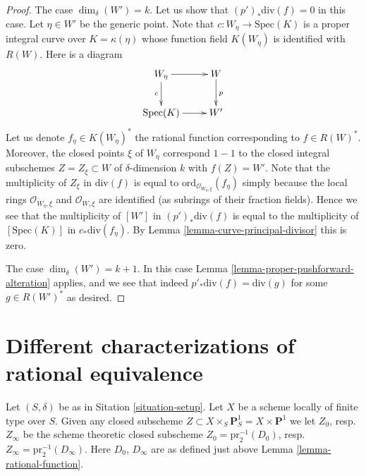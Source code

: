 \begin{proof}
\medskip\noindent
The case $\dim_\delta(W') = k$. Let us show that $(p')_*\text{div}(f) = 0$
in this case. Let $\eta \in W'$ be the generic point.
Note that $c : W_\eta \to \text{Spec}(K)$
is a proper integral curve over $K = \kappa(\eta)$
whose function field $K(W_\eta)$ is identified with $R(W)$.
Here is a diagram
$$
\xymatrix{
W_\eta \ar[r] \ar[d]_c & W \ar[d]^p \\
\text{Spec}(K) \ar[r] & W'
}
$$
Let us denote $f_\eta \in K(W_\eta)^*$ the rational function
corresponding to $f \in R(W)^*$.
Moreover, the closed points $\xi$ of $W_\eta$ correspond $1 - 1$ to the
closed integral subschemes $Z = Z_\xi \subset W$ of $\delta$-dimension $k$
with $f(Z) = W'$. Note that the multiplicity
of $Z_\xi$ in $\text{div}(f)$ is equal to
$\text{ord}_{\mathcal{O}_{W_\eta, \xi}}(f_\eta)$ simply because the
local rings $\mathcal{O}_{W_\eta, \xi}$ and $\mathcal{O}_{W, \xi}$
are identified (as subrings of their fraction fields).
Hence we see that the multiplicity of $[W']$ in
$(p')_*\text{div}(f)$ is equal to the multiplicity of
$[\text{Spec}(K)]$ in $c_*\text{div}(f_\eta)$.
By Lemma \ref{lemma-curve-principal-divisor} this is zero.

\medskip\noindent
The case $\dim_\delta(W') = k + 1$. In this case
Lemma \ref{lemma-proper-pushforward-alteration} applies,
and we see that indeed $p'_*\text{div}(f) = \text{div}(g)$
for some $g \in R(W')^*$ as desired.
\end{proof}















\section{Different characterizations of rational equivalence}
\label{section-different-rational-equivalence}

\noindent
Let $(S, \delta)$ be as in Sitation \ref{situation-setup}.
Let $X$ be a scheme locally of finite type over $S$.
Given any closed subscheme
$Z \subset X \times_S \mathbf{P}^1_S = X \times \mathbf{P}^1$
we let $Z_0$, resp.\ $Z_\infty$ be the scheme theoretic closed 
subscheme $Z_0 = \text{pr}_2^{-1}(D_0)$,
resp.\ $Z_\infty = \text{pr}_2^{-1}(D_\infty)$.
Here $D_0$, $D_\infty$ are as defined just above
Lemma \ref{lemma-rational-function}.

